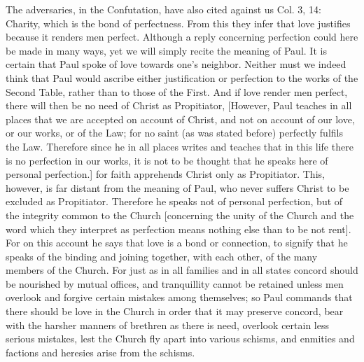The adversaries, in the Confutation, have also cited against us Col.
3, 14: Charity, which is the bond of perfectness.  From this they
infer that love justifies because it renders men perfect.  Although a
reply concerning perfection could here be made in many ways, yet we
will simply recite the meaning of Paul.  It is certain that Paul
spoke of love towards one's neighbor.  Neither must we indeed think
that Paul would ascribe either justification or perfection to the
works of the Second Table, rather than to those of the First.  And if
love render men perfect, there will then be no need of Christ as
Propitiator, [However, Paul teaches in all places that we are
accepted on account of Christ, and not on account of our love, or our
works, or of the Law; for no saint (as was stated before) perfectly
fulfils the Law.  Therefore since he in all places writes and teaches
that in this life there is no perfection in our works, it is not to
be thought that he speaks here of personal perfection.] for faith
apprehends Christ only as Propitiator.  This, however, is far distant
from the meaning of Paul, who never suffers Christ to be excluded as
Propitiator.  Therefore he speaks not of personal perfection, but of
the integrity common to the Church [concerning the unity of the
Church and the word which they interpret as perfection means nothing
else than to be not rent].  For on this account he says that love is
a bond or connection, to signify that he speaks of the binding and
joining together, with each other, of the many members of the Church.
For just as in all families and in all states concord should be
nourished by mutual offices, and tranquillity cannot be retained
unless men overlook and forgive certain mistakes among themselves; so
Paul commands that there should be love in the Church in order that
it may preserve concord, bear with the harsher manners of brethren as
there is need, overlook certain less serious mistakes, lest the
Church fly apart into various schisms, and enmities and factions and
heresies arise from the schisms.

